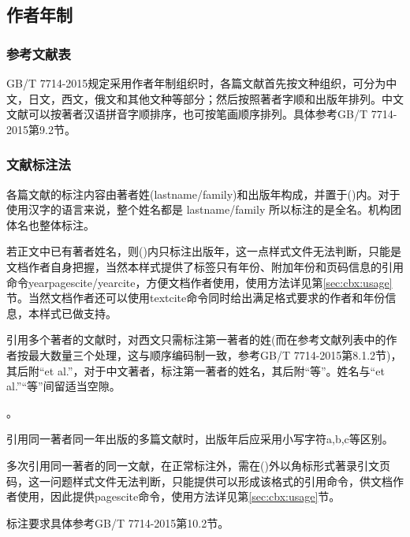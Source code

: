 \subsection{作者年制}

\subsubsection{参考文献表}

GB/T 7714-2015规定采用作者年制组织时，各篇文献首先按文种组织，可分为中文，日文，西文，俄文和其他文种等部分；然后按照著者字顺和出版年排列。中文文献可以按著者汉语拼音字顺排序，也可按笔画顺序排列。具体参考GB/T 7714-2015第9.2节。


\subsubsection{文献标注法}
各篇文献的标注内容由著者姓(lastname/family)和出版年构成，并置于()内。对于使用汉字的语言来说，整个姓名都是 lastname/family 所以标注的是全名。机构团体名也整体标注。

若正文中已有著者姓名，则()内只标注出版年，这一点样式文件无法判断，只能是文档作者自身把握，当然本样式提供了标签只有年份、附加年份和页码信息的引用命令yearpagescite/yearcite，方便文档作者使用，使用方法详见第\ref{sec:cbx:usage}节。当然文档作者还可以使用textcite命令同时给出满足格式要求的作者和年份信息，本样式已做支持。

引用多个著者的文献时，对西文只需标注第一著者的姓(而在参考文献列表中的作者按最大数量三个处理，这与顺序编码制一致，参考GB/T 7714-2015第8.1.2节)，其后附“et al.”，对于中文著者，标注第一著者的姓名，其后附“等”。姓名与“et al.”“等”间留适当空隙。

。

引用同一著者同一年出版的多篇文献时，出版年后应采用小写字符a,b,c等区别。

多次引用同一著者的同一文献，在正常标注外，需在()外以角标形式著录引文页码，这一问题样式文件无法判断，只能提供可以形成该格式的引用命令，供文档作者使用，因此提供pagescite命令，使用方法详见第\ref{sec:cbx:usage}节。

标注要求具体参考GB/T 7714-2015第10.2节。

